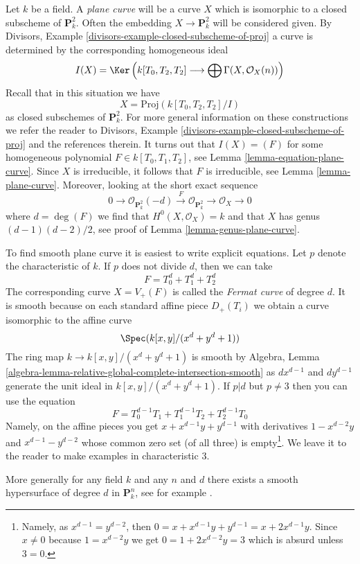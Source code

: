 \noindent
Let $k$ be a field. A {\it plane curve} will be a curve $X$ which is isomorphic
to a closed subscheme of $\mathbf{P}^2_k$. Often the embedding
$X \to \mathbf{P}^2_k$ will be considered given. By
Divisors, Example \ref{divisors-example-closed-subscheme-of-proj}
a curve is determined by the corresponding homogeneous ideal
$$
I(X) =
\Ker\left(
k[T_0, T_2, T_2] \longrightarrow \bigoplus \Gamma(X, \mathcal{O}_X(n))
\right)
$$
Recall that in this situation we have
$$
X = \text{Proj}(k[T_0, T_2, T_2]/I)
$$
as closed subschemes of $\mathbf{P}^2_k$.
For more general information on these constructions we refer the
reader to Divisors, Example \ref{divisors-example-closed-subscheme-of-proj}
and the references therein.
It turns out that $I(X) = (F)$ for some homogeneous polynomial
$F \in k[T_0, T_1, T_2]$, see Lemma \ref{lemma-equation-plane-curve}.
Since $X$ is irreducible, it follows that $F$ is irreducible, see
Lemma \ref{lemma-plane-curve}. Moreover, looking at the short exact
sequence
$$
0 \to \mathcal{O}_{\mathbf{P}^2_k}(-d) \xrightarrow{F}
\mathcal{O}_{\mathbf{P}^2_k} \to \mathcal{O}_X \to 0
$$
where $d = \deg(F)$ we find that $H^0(X, \mathcal{O}_X) = k$ and that $X$
has genus $(d - 1)(d - 2)/2$, see proof of Lemma \ref{lemma-genus-plane-curve}.

\medskip\noindent
To find smooth plane curve it is easiest to write explicit
equations. Let $p$ denote the characteristic of $k$. If $p$
does not divide $d$, then we can take
$$
F = T_0^d + T_1^d + T_2^d
$$
The corresponding curve $X = V_+(F)$ is called the
{\it Fermat curve} of degree $d$. It is smooth because
on each standard affine piece $D_+(T_i)$ we obtain
a curve isomorphic to the affine curve
$$
\Spec(k[x, y]/(x^d + y^d + 1))
$$
The ring map $k \to k[x, y]/(x^d + y^d + 1)$ is smooth by
Algebra, Lemma \ref{algebra-lemma-relative-global-complete-intersection-smooth}
as $d x^{d - 1}$ and $d y^{d - 1}$ generate the unit ideal
in $k[x, y]/(x^d + y^d + 1)$. If $p | d$ but $p \not = 3$
then you can use the equation
$$
F = T_0^{d - 1}T_1 + T_1^{d - 1}T_2 + T_2^{d - 1}T_0
$$
Namely, on the affine pieces you get $x + x^{d - 1}y + y^{d - 1}$
with derivatives $1 - x^{d - 2}y$ and $x^{d - 1} - y^{d - 2}$
whose common zero set (of all three) is empty\footnote{Namely,
as $x^{d - 1} = y^{d - 2}$, then $0 = x + x^{d - 1}y + y^{d - 1} =
x + 2 x^{d - 1} y$. Since $x \not = 0$ because $1 = x^{d - 2}y$
we get $0 = 1 + 2x^{d - 2}y = 3$ which is absurd unless $3 = 0$.}.
We leave it to the reader to make examples in characteristic $3$.

\medskip\noindent
More generally for any field $k$ and any $n$ and $d$ there exists
a smooth hypersurface of degree $d$ in $\mathbf{P}^n_k$, see
for example \cite{Poonen}.

